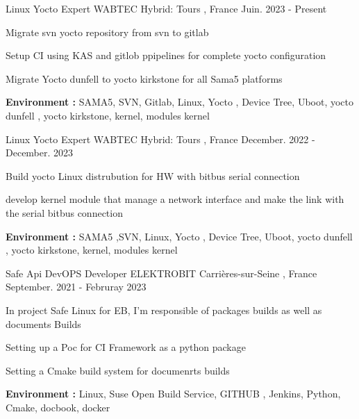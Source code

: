 \documentclass[11pt, a4paper]{awesome-cv} %
\begin{document}
\begin{cventries}


 \cventry
    {Linux Yocto Expert} %
    {WABTEC} %
    {Hybrid:  Tours , France} %
    {Juin. 2023 - Present} %
    { %
        \begin{cvitems}
            \item {Migrate svn yocto repository  from svn to gitlab }
            \item {Setup CI using KAS and gitlob ppipelines for complete yocto configuration}
            \item {Migrate Yocto dunfell to yocto kirkstone for all Sama5 platforms}
            \item { \textbf{Environment :} SAMA5, SVN, Gitlab, Linux, Yocto , Device Tree, Uboot, yocto dunfell , yocto kirkstone, kernel, modules kernel}
        \end{cvitems}
    }

 \cventry
    {Linux Yocto Expert} %
    {WABTEC} %
    {Hybrid:  Tours , France} %
    {December. 2022 - December. 2023} %
    { %
        \begin{cvitems}
            \item {Build yocto Linux distrubution for HW with bitbus serial connection}
            \item {develop kernel module that manage a network interface and make the link with the serial bitbus connection}
            \item { \textbf{Environment :} SAMA5 ,SVN, Linux, Yocto , Device Tree, Uboot, yocto dunfell , yocto kirkstone, kernel, modules kernel}
        \end{cvitems}
    }

 \cventry
    {Safe Api DevOPS Developer} %
    {ELEKTROBIT} %
    {Carrières-sur-Seine , France} %
    {September. 2021 - Februray 2023} %
    { %
        \begin{cvitems}
            \item {In project Safe Linux for EB, I'm responsible of packages builds as well as documents Builds}
            \item {Setting up a Poc for CI Framework as a python package}
            \item {Setting a Cmake build system for documenrts builds}                        
            \item { \textbf{Environment :} Linux, Suse Open Build Service, GITHUB , Jenkins, Python, Cmake, docbook, docker}
        \end{cvitems}
    }



\end{cventries}
\end{document}
